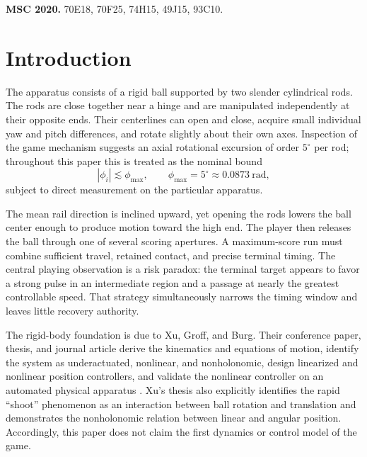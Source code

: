 \documentclass[11pt]{article}
\numberwithin{equation}{section}
\theoremstyle{definition}
\theoremstyle{remark}
\begin{document}
\medskip
\noindent\textbf{MSC 2020.} 70E18, 70F25, 74H15, 49J15, 93C10.

\section{Introduction}

The apparatus consists of a rigid ball supported by two slender cylindrical rods.  The rods are close together near a hinge and are manipulated independently at their opposite ends.  Their centerlines can open and close, acquire small individual yaw and pitch differences, and rotate slightly about their own axes.  Inspection of the game mechanism suggests an axial rotational excursion of order $5^\circ$ per rod; throughout this paper this is treated as the nominal bound
\begin{equation}
  |\phi_i|\lesssim\phi_{\max},
  \qquad
  \phi_{\max}=5^\circ\approx 0.0873\ \mathrm{rad},
  \label{eq:nominaltwist}
\end{equation}
subject to direct measurement on the particular apparatus.

The mean rail direction is inclined upward, yet opening the rods lowers the ball center enough to produce motion toward the high end.  The player then releases the ball through one of several scoring apertures.  A maximum-score run must combine sufficient travel, retained contact, and precise terminal timing.  The central playing observation is a risk paradox: the terminal target appears to favor a strong pulse in an intermediate region and a passage at nearly the greatest controllable speed.  That strategy simultaneously narrows the timing window and leaves little recovery authority.

The rigid-body foundation is due to Xu, Groff, and Burg.  Their conference paper, thesis, and journal article derive the kinematics and equations of motion, identify the system as underactuated, nonlinear, and nonholonomic, design linearized and nonlinear position controllers, and validate the nonlinear controller on an automated physical apparatus \citep{Xu2010,Xu2011,Xu2012}.  Xu's thesis also explicitly identifies the rapid ``shoot'' phenomenon as an interaction between ball rotation and translation and demonstrates the nonholonomic relation between linear and angular position.  Accordingly, this paper does not claim the first dynamics or control model of the game.
\end{document}
